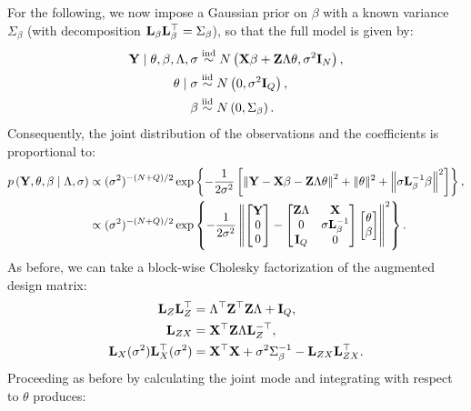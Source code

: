 \documentclass[10pt]{article}
\begin{document}
For the following, we now impose a Gaussian prior on $\beta$ with a
known variance $\Sigma_\beta$ (with decomposition ${\bf L}_\beta{\bf
  L}_\beta^\top = \Sigma_\beta$), so that
the full model is given by:
\begin{align*}
{\bf Y} \mid \theta, \beta, \Lambda, \sigma &
\overset{\mathrm{ind}}{\sim}
N\left({\bf X}\beta + {\bf Z}\Lambda\theta, \sigma^2{\bf I}_N\right),
\\
\theta \mid \sigma & \overset{\mathrm{iid}}{\sim} N\left(0,
  \sigma^2{\bf I}_Q\right), \\
\beta & \overset{\mathrm{iid}}{\sim} N\left(0,
  \Sigma_\beta\right).
\end{align*}
Consequently, the joint distribution of the observations and the coefficients is proportional to:
\begin{align*}
p\left({\bf Y}, \theta, \beta \mid \Lambda, \sigma\right) & \propto
(\sigma^2)^{-(N+Q)/2}\exp\left\{
-\frac{1}{2\sigma^2}\left[\left\|
{\bf Y} - {\bf X}\beta - {\bf Z}\Lambda\theta\right\|^2 + \|\theta\|^2
+ \left\|\sigma{\bf L}_\beta^{-1}\beta\right\|^2
\right]\right\}, \\
& \propto (\sigma^2)^{-(N+Q)/2}
\exp\left\{-\frac{1}{2\sigma^2}
\left\|
\begin{bmatrix}{\bf Y} \\ 0 \\ 0 \end{bmatrix} -
\begin{bmatrix}{\bf Z}\Lambda & {\bf X} \\
0 & \sigma{\bf L}_\beta^{-1} \\
{\bf I}_Q & 0
\end{bmatrix}
\begin{bmatrix} \theta \\ \beta \end{bmatrix}
\right\|^2\right\}.
\end{align*}
As before, we can take a block-wise Cholesky factorization of the
augmented design matrix:
\begin{align*}
{\bf L}_Z{\bf L}_Z^\top & = \Lambda^\top{\bf Z}^\top{\bf Z}\Lambda +
{\bf I}_Q, \\
{\bf L}_{ZX} & = {\bf X}^\top{\bf Z}\Lambda{\bf L}_Z^{-\top}, \\
{\bf L}_X(\sigma^2){\bf L}_X^\top(\sigma^2) & = {\bf X}^\top {\bf X} +
\sigma^2\Sigma_\beta^{-1}
- {\bf L}_{ZX}{\bf L}_{ZX}^\top.
\end{align*}
Proceeding as before by calculating the joint mode and integrating
with respect to $\theta$ produces:
\end{document}
